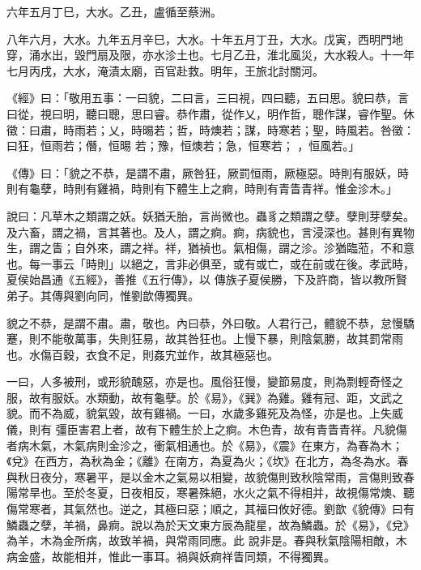 \begin{pinyinscope}
 六年五月丁巳，大水。乙丑，盧循至蔡洲。



 八年六月，大水。九年五月辛巳，大水。十年五月丁丑，大水。戊寅，西明門地穿，涌水出，毀門扇及限，亦水沴土也。七月乙丑，淮北風災，大水殺人。十一年七月丙戌，大水，淹漬太廟，百官赴救。明年，王旅北討關河。


《經》曰：「敬用五事：一曰貌，二曰言，三曰視，四曰聽，五曰思。貌曰恭，言曰從，視曰明，聽曰聰，思曰睿。恭作肅，從作乂，明作哲，聰作謀，睿作聖。休徵：曰肅，時雨若；乂，時晹若；哲，時燠若；謀，時寒若；聖，時風若。咎徵：曰狂，恒雨若；僭，恒晹
 若；豫，恒燠若；急，恒寒若；
 ，恒風若。」



 《傳》曰：「貌之不恭，是謂不肅，厥咎狂，厥罰恒雨，厥極惡。時則有服妖，時則有龜孽，時則有雞禍，時則有下體生上之痾，時則有青眚青祥。惟金沴木。」



 說曰：凡草木之類謂之妖。妖猶夭胎，言尚微也。蟲豸之類謂之孽。孽則芽孽矣。及六畜，謂之禍，言其著也。及人，謂之痾。痾，病貌也，言浸深也。甚則有異物生，謂之眚；自外來，謂之祥。祥，猶禎也。氣相傷，謂之沴。沴猶臨蒞，不和意也。每一事云「時則」以絕之，言非必俱至，或有或亡，或在前或在後。孝武時，夏侯始昌通《五經》，善推《五行傳》，以
 傳族子夏侯勝，下及許商，皆以教所賢弟子。其傳與劉向同，惟劉歆傳獨異。



 貌之不恭，是謂不肅。肅，敬也。內曰恭，外曰敬。人君行己，體貌不恭，怠慢驕蹇，則不能敬萬事，失則狂易，故其咎狂也。上慢下暴，則陰氣勝，故其罰常雨也。水傷百穀，衣食不足，則姦宄並作，故其極惡也。



 一曰，人多被刑，或形貌醜惡，亦是也。風俗狂慢，變節易度，則為剽輕奇怪之服，故有服妖。水類動，故有龜孽。於《易》，《巽》為雞。雞有冠、距，文武之貌。而不為威，貌氣毀，故有雞禍。一曰，水歲多雞死及為怪，亦是也。上失威儀，則有
 彊臣害君上者，故有下體生於上之痾。木色青，故有青眚青祥。凡貌傷者病木氣，木氣病則金沴之，衝氣相通也。於《易》，《震》在東方，為春為木；《兌》在西方，為秋為金；《離》在南方，為夏為火；《坎》在北方，為冬為水。春與秋日夜分，寒暑平，是以金木之氣易以相變，故貌傷則致秋陰常雨，言傷則致春陽常旱也。至於冬夏，日夜相反，寒暑殊絕，水火之氣不得相并，故視傷常燠、聽傷常寒者，其氣然也。逆之，其極曰惡；順之，其福曰攸好德。劉歆《貌傳》曰有鱗蟲之孽，羊禍，鼻痾。說以為於天文東方辰為龍星，故為鱗蟲。於《易》，《兌》為羊，木為金所病，故致羊禍，與常雨同應。此
 說非是。春與秋氣陰陽相敵，木病金盛，故能相并，惟此一事耳。禍與妖痾祥眚同類，不得獨異。




\end{pinyinscope}
